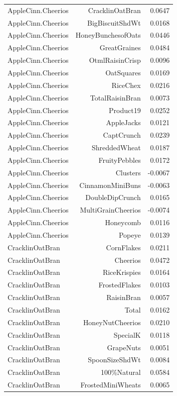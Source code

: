 \begin{longtable}{@{}lrr@{}}
AppleCinn.Cheerios & CracklinOatBran & 0.0647 \\
AppleCinn.Cheerios & BigBiscuitShdWt & 0.0168 \\
AppleCinn.Cheerios & HoneyBunchesofOats & 0.0446 \\
AppleCinn.Cheerios & GreatGraines & 0.0484 \\
AppleCinn.Cheerios & OtmlRaisinCrisp & 0.0096 \\
AppleCinn.Cheerios & OatSquares & 0.0169 \\
AppleCinn.Cheerios & RiceChex & 0.0216 \\
AppleCinn.Cheerios & TotalRaisinBran & 0.0073 \\
AppleCinn.Cheerios & Product19 & 0.0252 \\
AppleCinn.Cheerios & AppleJacks & 0.0121 \\
AppleCinn.Cheerios & CaptCrunch & 0.0239 \\
AppleCinn.Cheerios & ShreddedWheat & 0.0187 \\
AppleCinn.Cheerios & FruityPebbles & 0.0172 \\
AppleCinn.Cheerios & Clusters & -0.0067 \\
AppleCinn.Cheerios & CinnamonMiniBuns & -0.0063 \\
AppleCinn.Cheerios & DoubleDipCrunch & 0.0165 \\
AppleCinn.Cheerios & MultiGrainCheerios & -0.0074 \\
AppleCinn.Cheerios & Honeycomb & 0.0116 \\
AppleCinn.Cheerios & Popeye & 0.0139 \\
CracklinOatBran & CornFlakes & 0.0211 \\
CracklinOatBran & Cheerios & 0.0472 \\
CracklinOatBran & RiceKrispies & 0.0164 \\
CracklinOatBran & FrostedFlakes & 0.0103 \\
CracklinOatBran & RaisinBran & 0.0057 \\
CracklinOatBran & Total & 0.0162 \\
CracklinOatBran & HoneyNutCheerios & 0.0210 \\
CracklinOatBran & SpecialK & 0.0118 \\
CracklinOatBran & GrapeNuts & 0.0051 \\
CracklinOatBran & SpoonSizeShdWt & 0.0084 \\
CracklinOatBran & 100\%Natural & 0.0584 \\
CracklinOatBran & FrostedMiniWheats & 0.0065 \\

\end{longtable}
